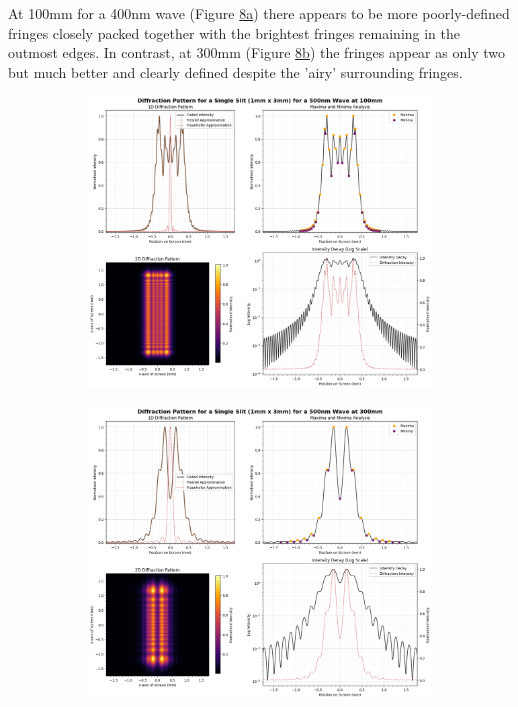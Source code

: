 \documentclass[12pt]{article}
\begin{document}
At 100mm for a 400nm wave (Figure \hyperref[fig:8a]{8a}) there appears to be more poorly-defined fringes closely packed together with the brightest fringes remaining in the outmost edges. In contrast, at
300mm (Figure \hyperref[fig:8b]{8b}) the fringes appear as only two but much better and clearly defined despite the 'airy' surrounding fringes.

\begin{figure}[H]
    \centering
    \begin{subfigure}[b]{.48\textwidth}
        \centering
        \includegraphics[width=\linewidth]{vsslit_500nm_100mm.png}
        \label{fig:9a}
    \end{subfigure}
    \hspace{-.5em}
    \begin{subfigure}[b]{.48\textwidth}
        \centering
        \includegraphics[width=\linewidth]{vsslit_500nm_300mm.png}

\end{subfigure}
\end{figure}
\end{document}
